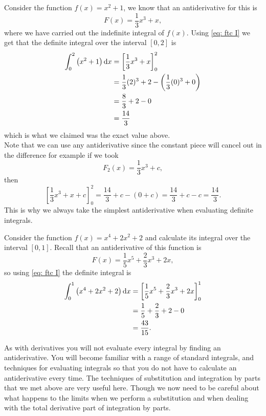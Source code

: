 \begin{ex}
Consider the function $f(x)=x^{2}+1$, we know that an antiderivative for this is 
\begin{equation*}
F(x)=\frac{1}{3}x^{3}+x,
\end{equation*}
where we have carried out the indefinite integral of $f(x)$. Using \cref{eq: ftc I} we get that the definite integral over the interval $[0,2]$ is
\begin{align*}
\int_{0}^{2}\left(x^{2}+1\right)\mathrm{d} x 	&=\left[\frac{1}{3}x^{3}+x\right]_{0}^{2}\\
						&=\frac{1}{3}(2)^{3}+2-\left(\frac{1}{3}(0)^{3}+0\right)\\
						&=\frac{8}{3}+2-0\\
						&=\frac{14}{3}
\end{align*}
which is what we claimed was the exact value above.\\

Note that we can use any antiderivative since the constant piece will cancel out in the difference for example if we took
\begin{equation*}
F_{2}(x)=\frac{1}{3}x^{3}+c,
\end{equation*}
then 
\begin{equation*}
\left[\frac{1}{3}x^{3}+x+c\right]_{0}^{2}=\frac{14}{3}+c-\left(0+c\right)=\frac{14}{3}+c-c=\frac{14}{3}.
\end{equation*}
This is why we always take the simplest antiderivative when evaluating definite integrals.
\end{ex}


\begin{ex}
Consider the function $f(x)=x^{4}+2x^{2}+2$ and calculate its integral over the interval $[0,1]$. Recall that an antiderivative of this function is
\begin{equation*}
F(x)=\frac{1}{5}x^{5}+\frac{2}{3}x^{3}+2x,
\end{equation*}
so using \cref{eq: ftc I} the definite integral is
\begin{align*}
\int_{0}^{1}\left(x^{4}+2x^{2}+2\right)\mathrm{d} x 	&=\left[\frac{1}{5}x^{5}+\frac{2}{3}x^{3}+2x\right]_{0}^{1}\\
								&=\frac{1}{5}+\frac{2}{3}+2 -0\\
								&=\frac{43}{15}.
\end{align*}
\end{ex}

As with derivatives you will not evaluate every integral by finding an antiderivative. You will become familiar with a range of standard integrals, and techniques for evaluating integrals so that you do not have to calculate an antiderivative every time. The techniques of substitution and integration by parts that we met above are very useful here. Though we now need to be careful about what happens to the limits when we perform a substitution and when dealing with the total derivative part of integration by parts.

